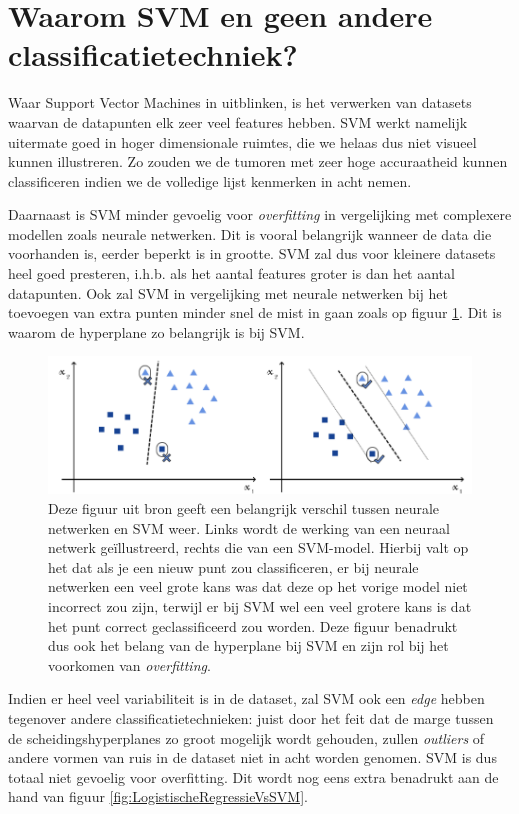 \documentclass[TeamE-eindrapport]{subfiles}
\begin{document}
	\section{Waarom SVM en geen andere classificatietechniek?}
	
	Waar Support Vector Machines in uitblinken, is het verwerken van datasets waarvan de datapunten elk zeer veel features hebben. SVM werkt namelijk uitermate goed in hoger dimensionale ruimtes, die we helaas dus niet visueel kunnen illustreren. Zo zouden we de tumoren met zeer hoge accuraatheid kunnen classificeren indien we de volledige lijst kenmerken in acht nemen.
	
	Daarnaast is SVM minder gevoelig voor \textit{overfitting} in vergelijking met complexere modellen zoals neurale netwerken. Dit is vooral belangrijk wanneer de data die voorhanden is, eerder beperkt is in grootte. SVM zal dus voor kleinere datasets heel goed presteren, i.h.b. als het aantal features groter is dan het aantal datapunten. Ook zal SVM in vergelijking met neurale netwerken bij het toevoegen van extra punten minder snel de mist in gaan zoals op figuur \ref{fig:NeuralNetsVsSVM}. Dit is waarom de hyperplane zo belangrijk is bij SVM. 
	
	\begin{figure}[h!]
		\centering
		\includegraphics[width=.8\textwidth]{NeuralNets-vs-SVM}
		\caption{Deze figuur uit bron \cite{Luca_2022} geeft een belangrijk verschil tussen neurale netwerken en SVM weer. Links wordt de werking van een neuraal netwerk geïllustreerd, rechts die van een SVM-model. Hierbij valt op het dat als je een nieuw punt zou classificeren, er bij neurale netwerken een veel grote kans was dat deze op het vorige model niet incorrect zou zijn, terwijl er bij SVM wel een veel grotere kans is dat het punt correct geclassificeerd zou worden. Deze figuur benadrukt dus ook het belang van de hyperplane bij SVM en zijn rol bij het voorkomen van \textit{overfitting}. }
		\label{fig:NeuralNetsVsSVM}
	\end{figure}
	
	Indien er heel veel variabiliteit is in de dataset, zal SVM ook een \textit{edge} hebben tegenover andere classificatietechnieken: juist door het feit dat de marge tussen de scheidingshyperplanes zo groot mogelijk wordt gehouden, zullen \textit{outliers} of andere vormen van ruis in de dataset niet in acht worden genomen. SVM is dus totaal niet gevoelig voor overfitting. Dit wordt nog eens extra benadrukt aan de hand van figuur \ref{fig:LogistischeRegressieVsSVM}.
	
\end{document}
